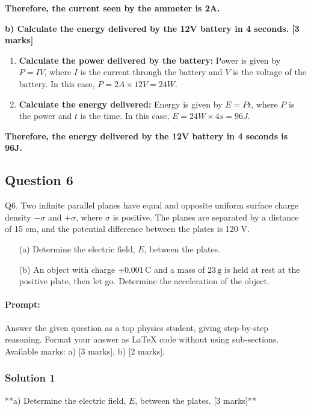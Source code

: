\documentclass{article}
\begin{document}
\textbf{Therefore, the current seen by the ammeter is 2A.}

\textbf{b) Calculate the energy delivered by the 12V battery in 4 seconds. [3 marks]}

\begin{enumerate}
\item \textbf{Calculate the power delivered by the battery:} Power is given by $P = IV$, where $I$ is the current through the battery and $V$ is the voltage of the battery. In this case, $P = 2A \times 12V = 24W$.

\item \textbf{Calculate the energy delivered:} Energy is given by $E = Pt$, where $P$ is the power and $t$ is the time. In this case, $E = 24W \times 4s = 96J$.
\end{enumerate}

\textbf{Therefore, the energy delivered by the 12V battery in 4 seconds is 96J.} 


\subsection{Question 6}
Q6. Two infinite parallel planes have equal and opposite uniform surface charge density $-\sigma$ and $+\sigma$, where $\sigma$ is positive. The planes are separated by a distance of 15 cm, and the potential difference between the plates is 120 V.

\begin{enumerate}
    \item[(a)] Determine the electric field, $E$, between the plates.
    \item[(b)] An object with charge $+0.001 \, \text{C}$ and a mass of $23 \, \text{g}$ is held at rest at the positive plate, then let go. Determine the acceleration of the object.
\end{enumerate}


\paragraph{Prompt: \\} 
Answer the given question as a top physics student, giving step-by-step reasoning. Format your answer as LaTeX code without using sub-sections. Available marks: a) [3 marks], b) [2 marks].

\subsubsection{Solution 1}
**a) Determine the electric field, $E$, between the plates. [3 marks]**
\end{document}
